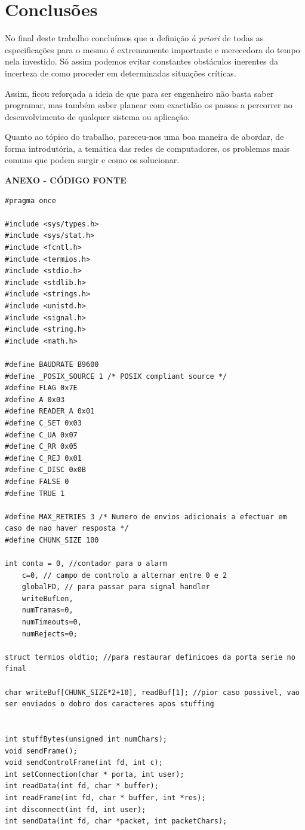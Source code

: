 \documentclass[a4paper,11pt]{article}
\begin{document}
\section{Conclusões}

No final deste trabalho concluímos que a definição \textit{à priori} de todas as especificações para o mesmo é extremamente importante e merecedora do tempo nela investido. Só assim podemos evitar constantes obstáculos inerentes da incerteza de como proceder em determinadas situações críticas.

Assim, ficou reforçada a ideia de que para ser engenheiro não basta saber programar, mas também saber planear com exactidão os passos a percorrer no desenvolvimento de qualquer sistema ou aplicação.

Quanto ao tópico do trabalho, pareceu-nos uma boa maneira de abordar, de forma introdutória, a temática das redes de computadores, os problemas mais comuns que podem surgir e como os solucionar.

\newpage

\vspace*{\fill} 
\centering
\begin{Huge}\textbf{ANEXO - CÓDIGO FONTE}\end{Huge}
\vspace*{\fill}
\thispagestyle{empty}
\setcounter{page}{1}

\newpage

\lstset{language=C,
		showstringspaces=false,
		frame=tb,
		caption=Protocol.h}
\begin{lstlisting}
#pragma once

#include <sys/types.h>
#include <sys/stat.h>
#include <fcntl.h>
#include <termios.h>
#include <stdio.h>
#include <stdlib.h>
#include <strings.h>
#include <unistd.h>
#include <signal.h>
#include <string.h>
#include <math.h>

#define BAUDRATE B9600
#define _POSIX_SOURCE 1 /* POSIX compliant source */
#define FLAG 0x7E
#define A 0x03
#define READER_A 0x01
#define C_SET 0x03
#define C_UA 0x07
#define C_RR 0x05
#define C_REJ 0x01
#define C_DISC 0x0B
#define FALSE 0
#define TRUE 1

#define MAX_RETRIES 3 /* Numero de envios adicionais a efectuar em caso de nao haver resposta */
#define CHUNK_SIZE 100 

int	conta = 0, //contador para o alarm
	c=0, // campo de controlo a alternar entre 0 e 2
	globalFD, // para passar para signal handler
	writeBufLen,
	numTramas=0,
	numTimeouts=0,
	numRejects=0;
	
struct termios oldtio; //para restaurar definicoes da porta serie no final

char writeBuf[CHUNK_SIZE*2+10], readBuf[1]; //pior caso possivel, vao ser enviados o dobro dos caracteres apos stuffing


int stuffBytes(unsigned int numChars);
void sendFrame();
void sendControlFrame(int fd, int c);
int setConnection(char * porta, int user);
int readData(int fd, char * buffer);
int readFrame(int fd, char * buffer, int *res);
int disconnect(int fd, int user);
int sendData(int fd, char *packet, int packetChars);
\end{lstlisting}
\end{document}
